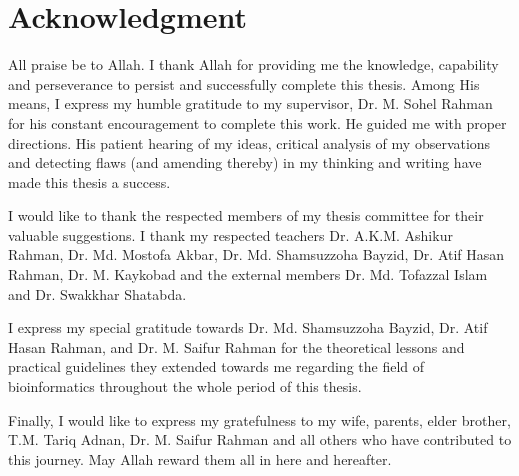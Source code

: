 \chapter*{Acknowledgment}

All praise be to Allah. I thank Allah for providing me the knowledge, capability and perseverance to persist and successfully complete this thesis. Among His means, I express my  humble gratitude to my supervisor, Dr. M. Sohel Rahman for his constant encouragement to complete this work. He guided me with proper directions. His patient hearing of my ideas, critical analysis of my observations and detecting flaws (and amending thereby) in my thinking and writing have made this thesis a success.

I would like to thank the respected members of my thesis committee for their valuable suggestions. I thank my respected teachers Dr. A.K.M. Ashikur Rahman, Dr. Md. Mostofa Akbar, Dr. Md. Shamsuzzoha Bayzid, Dr. Atif Hasan Rahman, Dr. M. Kaykobad and the external members Dr. Md. Tofazzal Islam and Dr. Swakkhar Shatabda.

I express my special gratitude towards Dr. Md. Shamsuzzoha Bayzid, Dr. Atif Hasan Rahman, and Dr. M. Saifur Rahman for the theoretical lessons and practical guidelines they extended towards me regarding the field of bioinformatics throughout the whole period of this thesis.  

Finally, I would like to express my gratefulness to my wife, parents, elder brother, T.M. Tariq Adnan, Dr. M. Saifur Rahman and all others who have contributed to this journey. May Allah reward them all in here and hereafter.
